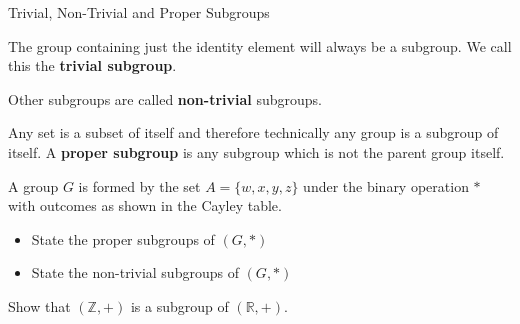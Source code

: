 \documentclass[8pt]{beamer}
\begin{document}
\begin{frame}{Trivial, Non-Trivial and Proper Subgroups}
	\begin{definition}
		The group containing just the identity element will always be a subgroup. We call this the \textbf{trivial subgroup}. 
	\end{definition}

	\begin{definition}
		Other subgroups are called \textbf{non-trivial} subgroups. 
	\end{definition}
	
	\begin{definition}
Any set is a subset of itself and therefore technically any group is a subgroup of itself. A \textbf{proper subgroup} is any subgroup which is not the parent group itself.
	\end{definition}

\begin{Problem}
	A group $G$ is formed by the set  $A=\{w,x,y,z\}$ under the binary operation  $*$ with outcomes as shown in the Cayley table.
	 \begin{itemize}
		 \item State the proper subgroups of $(G,*)$
		 \item State the non-trivial subgroups of  $(G,*)$
	\end{itemize}
\end{Problem}



 \begin{Problem}
	 Show that $(\mathbb{Z},+)$ is a subgroup of  $(\mathbb{R},+)$.	
\end{Problem}

\end{frame}
\end{document}
